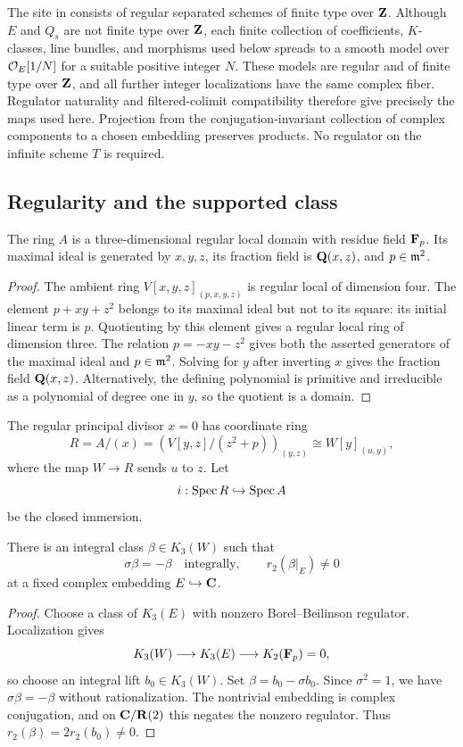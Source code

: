 \begin{remark}\label{d3:rem:spreading}
The site in \cite{BunkeTamme} consists of regular separated schemes of finite type over $\mathbf Z$. Although $E$ and $Q_s$ are not finite type over $\mathbf Z$, each finite collection of coefficients, $K$-classes, line bundles, and morphisms used below spreads to a smooth model over $\mathcal O_E[1/N]$ for a suitable positive integer $N$. These models are regular and of finite type over $\mathbf Z$, and all further integer localizations have the same complex fiber. Regulator naturality and filtered-colimit compatibility therefore give precisely the maps used here. Projection from the conjugation-invariant collection of complex components to a chosen embedding preserves products. No regulator on the infinite scheme $T$ is required.
\end{remark}

\subsection{Regularity and the supported class}

\begin{lemma}\label{d3:lem:regularA}
The ring $A$ is a three-dimensional regular local domain with residue field $\mathbf F_p$. Its maximal ideal is generated by $x,y,z$, its fraction field is $\mathbf Q(x,z)$, and $p\in\mathfrak m^2$.
\end{lemma}
\begin{proof}
The ambient ring $V[x,y,z]_{(p,x,y,z)}$ is regular local of dimension four. The element $p+xy+z^2$ belongs to its maximal ideal but not to its square: its initial linear term is $p$. Quotienting by this element gives a regular local ring of dimension three. The relation $p=-xy-z^2$ gives both the asserted generators of the maximal ideal and $p\in\mathfrak m^2$. Solving for $y$ after inverting $x$ gives the fraction field $\mathbf Q(x,z)$. Alternatively, the defining polynomial is primitive and irreducible as a polynomial of degree one in $y$, so the quotient is a domain.
\end{proof}

The regular principal divisor $x=0$ has coordinate ring
\[
R=A/(x)=\left(V[y,z]/(z^2+p)\right)_{(y,z)}
\cong W[y]_{(u,y)},
\]
where the map $W\to R$ sends $u$ to $z$. Let
\[
i:\operatorname{Spec} R\hookrightarrow\operatorname{Spec} A
\]
be the closed immersion.

\begin{lemma}\label{d3:lem:beta}
There is an integral class $\beta\in K_3(W)$ such that
\[
\sigma\beta=-\beta\quad\text{integrally},\qquad r_2(\beta|_E)\neq 0
\]
at a fixed complex embedding $E\hookrightarrow\mathbf C$.
\end{lemma}
\begin{proof}
Choose a class of $K_3(E)$ with nonzero Borel--Beilinson regulator. Localization gives
\[
K_3(W)\longrightarrow K_3(E)\longrightarrow K_2(\mathbf F_p)=0,
\]
so choose an integral lift $b_0\in K_3(W)$. Set $\beta=b_0-\sigma b_0$. Since $\sigma^2=1$, we have $\sigma\beta=-\beta$ without rationalization. The nontrivial embedding is complex conjugation, and on $\mathbf C/\mathbf R(2)$ this negates the nonzero regulator. Thus $r_2(\beta)=2r_2(b_0)\neq 0$.
\end{proof}

